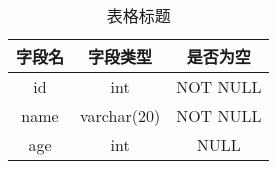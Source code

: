 \xiaosi 

\wuhao
\begin{table}[H]
  \centering
  \caption{表格标题}
  \label{tab:my-table}
  \begin{tabular}{|c|c|c|}
    \hline
    字段名 & 字段类型 & 是否为空 \\
    \hline
    id & int & NOT NULL \\
    \hline
    name & varchar(20) & NOT NULL \\
    \hline
    age & int & NULL \\
    \hline
  \end{tabular}
\end{table}


